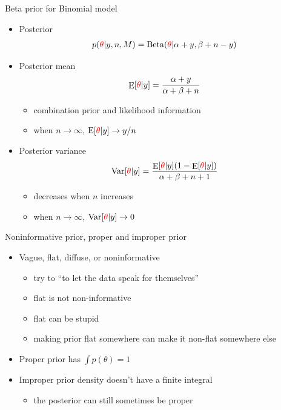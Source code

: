\documentclass[english,t]{beamer}
\DeclareMathOperator{\E}{E}
\DeclareMathOperator{\Var}{Var}
\begin{document}
\begin{frame}{Beta prior for Binomial model}

  \begin{itemize}
  \item Posterior
    \baselineskip
    \begin{align*}
      p({\color{red} \theta}|y,n,M) = \text{Beta}({\color{red} \theta}|\alpha+y,\beta+n-y)
    \end{align*}
  \item Posterior mean
    \baselineskip
    \begin{align*}
      \E[{\color{red} \theta}|y] = \frac{\alpha+y}{\alpha+\beta+n}
    \end{align*}
    \begin{itemize}
    \item combination prior and likelihood information
    \item when $n\rightarrow\infty$, $\text{E}[{\color{red} \theta}|y]\rightarrow y/n$
    \end{itemize}
    \pause
  \item  Posterior variance
    \baselineskip
    \begin{align*}
      \Var[{\color{red} \theta}|y]=\frac{\E[{\color{red} \theta}|y](1-\E[{\color{red} \theta}|y])}{\alpha+\beta+n+1}
    \end{align*}
    \begin{itemize}
    \item decreases when $n$ increases
    \item when $n\rightarrow\infty$, $\text{Var}[{\color{red} \theta}|y]\rightarrow 0$
    \end{itemize}      
  \end{itemize}

\end{frame}


\begin{frame}{Noninformative prior, proper and improper prior}

  \begin{itemize}
  \item Vague, flat, diffuse, or noninformative
    \begin{itemize}
    \item try to ``to let the data speak for themselves''
    \item flat is not non-informative
    \item flat can be stupid
    \item making prior flat somewhere can make it non-flat somewhere
      else
    \end{itemize}
  \item Proper prior has $\int p(\theta) = 1$
  \item Improper prior density doesn't have a finite integral
    \begin{itemize}
    \item the posterior can still sometimes be proper
    \end{itemize}
  \end{itemize}
  
\end{frame}
\end{document}
